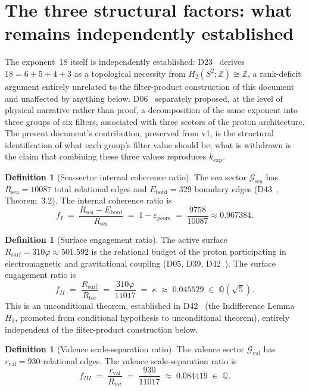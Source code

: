 \documentclass[12pt,a4paper]{article}
\newcommand{\Gsea}{\mathcal{G}_{\mathrm{sea}}}
\newcommand{\Gval}{\mathcal{G}_{\mathrm{val}}}
\theoremstyle{plain}
\theoremstyle{definition}
\newtheorem{definition}[theorem]{Definition}
\theoremstyle{remark}
\newcommand{\vp}{\varphi}
\newcommand{\kap}{\kappa}
\newcommand{\rval}{r_{\mathrm{val}}}
\newcommand{\Rsea}{R_{\mathrm{sea}}}
\newcommand{\Rtot}{R_{\mathrm{tot}}}
\newcommand{\Rsurf}{R_{\mathrm{surf}}}
\newcommand{\egeom}{\varepsilon_{\mathrm{geom}}}
\begin{document}
\section{The three structural factors: what remains independently established}
\label{sec:filters}

The exponent~18 itself is independently established: D23~\citep{D23} derives $18=6+5+4+3$ as a topological necessity from $H_2(S^2;\mathbb{Z})\cong\mathbb{Z}$, a rank-deficit argument entirely unrelated to the filter-product construction of this document and unaffected by anything below. D06~\citep{D06} separately proposed, at the level of physical narrative rather than proof, a decomposition of the same exponent into three groups of six filters, associated with three sectors of the proton architecture. The present document's contribution, preserved from v1, is the structural identification of what each group's filter value should be; what is withdrawn is the claim that combining these three values reproduces $k_{\exp}$.

\begin{definition}[Sea-sector internal coherence ratio]
\label{def:fI}
The sea sector $\Gsea$ has $\Rsea=10087$ total relational edges and $E_{\mathrm{bord}}=329$ boundary edges (D43~\citep{D43}, Theorem~3.2). The internal coherence ratio is
\[
f_I \;=\; \frac{\Rsea-E_{\mathrm{bord}}}{\Rsea} \;=\; 1-\egeom \;=\; \frac{9758}{10087} \approx 0.967384.
\]
\end{definition}

\begin{definition}[Surface engagement ratio]
\label{def:fII}
The active surface $\Rsurf=310\vp\approx501.592$ is the relational budget of the proton participating in electromagnetic and gravitational coupling (D05, D39, D42~\citep{D05,D39,D42}). The surface engagement ratio is
\[
f_{II} \;=\; \frac{\Rsurf}{\Rtot} \;=\; \frac{310\vp}{11017} \;=\; \kap \;\approx\; 0.045529 \;\in\;\mathbb{Q}(\sqrt5).
\]
This is an unconditional theorem, established in D42~\citep{D42} (the Indifference Lemma $H_3$, promoted from conditional hypothesis to unconditional theorem), entirely independent of the filter-product construction below.
\end{definition}

\begin{definition}[Valence scale-separation ratio]
\label{def:fIII}
The valence sector $\Gval$ has $\rval=930$ relational edges. The valence scale-separation ratio is
\[
f_{III} \;=\; \frac{\rval}{\Rtot} \;=\; \frac{930}{11017} \;\approx\; 0.084419 \;\in\;\mathbb{Q}.
\]
\end{definition}
\end{document}
